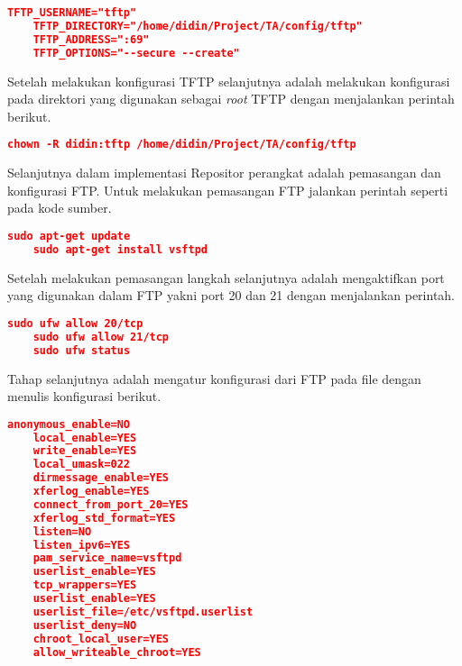 \begin{lstlisting}[frame=single,tabsize=2,breaklines,caption={Konfigurasi TFTP },label=nonrootuser, captionpos=b, language=json,numbers=none]
   	TFTP_USERNAME="tftp"
   	TFTP_DIRECTORY="/home/didin/Project/TA/config/tftp"
   	TFTP_ADDRESS=":69"
   	TFTP_OPTIONS="--secure --create"
\end{lstlisting}
        Setelah melakukan konfigurasi TFTP selanjutnya adalah melakukan konfigurasi pada direktori yang digunakan sebagai \textit{root} TFTP dengan menjalankan perintah berikut.
    \begin{lstlisting}[frame=single,tabsize=2,breaklines,caption={Konfigurasi direktori TFTP },label=nonrootuser, captionpos=b, language=json,numbers=none]
    chown -R didin:tftp /home/didin/Project/TA/config/tftp
    \end{lstlisting}
        Selanjutnya dalam implementasi Repositor perangkat adalah pemasangan dan konfigurasi FTP. Untuk melakukan pemasangan FTP jalankan perintah seperti pada kode sumber.
    \begin{lstlisting}[frame=single,tabsize=2,breaklines,caption={Pemasangan FTP },label=nonrootuser, captionpos=b, language=json,numbers=none]
	sudo apt-get update
	sudo apt-get install vsftpd
    \end{lstlisting}
        Setelah melakukan pemasangan langkah selanjutnya adalah mengaktifkan port yang digunakan dalam FTP yakni port 20 dan 21 dengan menjalankan perintah.
    \begin{lstlisting}[frame=single,tabsize=2,breaklines,caption={Aktivasi port FTP},label=nonrootuser, captionpos=b, language=json,numbers=none]
    sudo ufw allow 20/tcp
    sudo ufw allow 21/tcp
    sudo ufw status
    \end{lstlisting}
        Tahap selanjutnya adalah mengatur konfigurasi dari FTP pada file  dengan menulis konfigurasi berikut.
    \begin{lstlisting}[frame=single,tabsize=2,breaklines,caption={Konfigurasi file FTP},label=nonrootuser, captionpos=b, language=json,numbers=none]
    anonymous_enable=NO
    local_enable=YES		
    write_enable=YES		
    local_umask=022		        
    dirmessage_enable=YES	        
    xferlog_enable=YES		
    connect_from_port_20=YES        
    xferlog_std_format=YES          
    listen=NO   			
    listen_ipv6=YES		        
    pam_service_name=vsftpd         
    userlist_enable=YES  	        
    tcp_wrappers=YES
    userlist_enable=YES                   
    userlist_file=/etc/vsftpd.userlist
    userlist_deny=NO
    chroot_local_user=YES
    allow_writeable_chroot=YES
    \end{lstlisting}
